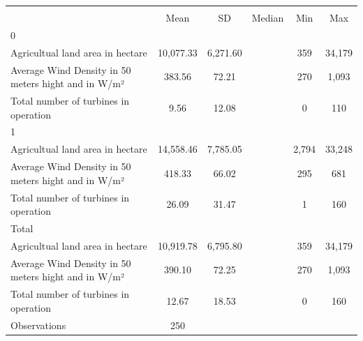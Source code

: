 {
\def\sym#1{\ifmmode^{#1}\else\(^{#1}\)\fi}
\begin{tabular}{l*{1}{ccccc}}
\toprule
                &\multicolumn{5}{c}{}                             \\
                &\multicolumn{1}{c}{{Mean}}&\multicolumn{1}{c}{{SD}}&\multicolumn{1}{c}{{Median}}&\multicolumn{1}{c}{{Min}}&\multicolumn{1}{c}{{Max}}\\
\midrule
0               &         &         &         &         &         \\
Agricultual land area in hectare&10,077.33& 6,271.60&         &      359&   34,179\\
Average Wind Density in 50 meters hight and in W/m²&   383.56&    72.21&         &      270&    1,093\\
Total number of turbines in operation&     9.56&    12.08&         &        0&      110\\
\midrule
1               &         &         &         &         &         \\
Agricultual land area in hectare&14,558.46& 7,785.05&         &    2,794&   33,248\\
Average Wind Density in 50 meters hight and in W/m²&   418.33&    66.02&         &      295&      681\\
Total number of turbines in operation&    26.09&    31.47&         &        1&      160\\
\midrule
Total           &         &         &         &         &         \\
Agricultual land area in hectare&10,919.78& 6,795.80&         &      359&   34,179\\
Average Wind Density in 50 meters hight and in W/m²&   390.10&    72.25&         &      270&    1,093\\
Total number of turbines in operation&    12.67&    18.53&         &        0&      160\\
\midrule
Observations    &      250&         &         &         &         \\
\bottomrule
\end{tabular}
}
